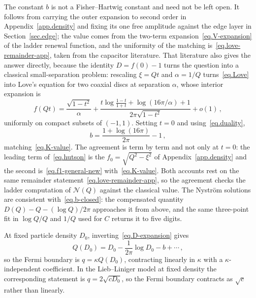 \documentclass[11pt,a4paper]{article}
\theoremstyle{definition}
\begin{document}
The constant $b$ is not a Fisher--Hartwig constant and need not be left open.
It follows from carrying the outer expansion to second order in
Appendix~\ref{app.density} and fixing its one free amplitude against the edge
layer in Section~\ref{sec.edge}; the value comes from the two-term
expansion~\eqref{eq.V-expansion} of the ladder renewal function, and the
uniformity of the matching is~\eqref{eq.love-remainder-app}, taken from the
capacitor literature.  That literature also gives the answer directly,
because the identity $D = f(0)-1$ turns the question into a classical
small-separation problem: rescaling $\xi = Qt$ and $\alpha = 1/Q$
turns~\eqref{eq.Love} into Love's equation for two coaxial discs at separation
$\alpha$, whose interior expansion is~\cite{Hutson1963, FarinaLangMartin2022}
\begin{equation}\label{eq.hutson}
  f(Qt) = \frac{\sqrt{1-t^2}}{\alpha}
  + \frac{t\log\frac{1-t}{1+t} + \log(16\pi/\alpha) + 1}
         {2\pi\sqrt{1-t^2}}
  + o(1)\,,
\end{equation}
uniformly on compact subsets of $(-1,1)$.  Setting $t = 0$ and using~\eqref{eq.duality},
\begin{equation}\label{eq.b-closed}
  b = \frac{1+\log(16\pi)}{2\pi} - 1 \,,
\end{equation}
matching~\eqref{eq.K-value}.  The agreement is term by term and not
only at $t = 0$: the leading term of~\eqref{eq.hutson} is the
$f_0 = \sqrt{Q^2-\xi^2}$ of Appendix~\ref{app.density} and the second
is~\eqref{eq.f1-general-new} with~\eqref{eq.K-value}.  Both accounts rest on the
same remainder statement~\eqref{eq.love-remainder-app}, so the agreement checks
the ladder computation of $\mathcal N(Q)$ against the classical value.
The Nystr\"om solutions are consistent with~\eqref{eq.b-closed}: the compensated
quantity $D(Q) - Q - (\log Q)/2\pi$ approaches it from above, and the same
three-point fit in $\log Q/Q$ and $1/Q$ used for $C$ returns it to five digits.

At fixed particle density $D_0$, inverting~\eqref{eq.D-expansion} gives
\begin{equation}\label{eq.Q-of-D}
  Q(D_0) = D_0 - \frac{1}{2\pi}\log D_0 - b + \cdots\,,
\end{equation}
so the Fermi boundary is $q = \kappa Q(D_0)$, contracting linearly in $\kappa$
with a $\kappa$-independent coefficient.  In the Lieb--Liniger model at fixed
density the corresponding statement is $q = 2\sqrt{c D_0}$, so the Fermi
boundary contracts as $\sqrt{c}$ rather than linearly.
\end{document}
